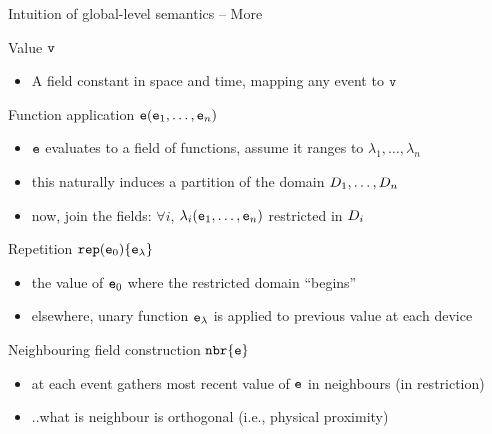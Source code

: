 \documentclass[presentation, 9pt]{beamer}\mode<presentation>{\usetheme{AMSBolognaFC}}
\begin{document}
\begin{frame}[fragile]{Intuition of global-level semantics -- More}
\begin{exampleblock}{Value $\texttt{v}$}
	\begin{itemize}
	\item A field constant in space and time, mapping any event to $\texttt{v}$
	\end{itemize}
	\end{exampleblock}
	\begin{exampleblock}{Function application ${\texttt{e}} (\texttt{e}_1,\ldots,\texttt{e}_n)$}
	\begin{itemize}
	\item $\texttt{e}$ evaluates to a field of functions, assume it ranges to $\lambda_1,\ldots,\lambda_n$
	\item this naturally induces a partition of the domain $D_1,\ldots,D_n$
	\item now, join the fields: $\forall i$, $\lambda_i (\texttt{e}_1,\ldots,\texttt{e}_n)$ restricted in $D_i$
	\end{itemize}
	\end{exampleblock}
	\begin{exampleblock}{Repetition $\texttt{rep}(\texttt{e}_0)\{\texttt{e}_\lambda\}$}
	\begin{itemize}
	\item the value of $\texttt{e}_0$ where the restricted domain ``begins''
	\item elsewhere, unary function $\texttt{e}_\lambda$ is applied to previous value at each device
	\end{itemize}
	\end{exampleblock}
	\begin{exampleblock}{Neighbouring  field construction $\texttt{nbr}\{\texttt{e}\}$}
	\begin{itemize}
	\item at each event gathers most recent value of $\texttt{e}$ in neighbours (in restriction)
	\item ..what is neighbour is orthogonal (i.e., physical proximity)
	\end{itemize}
	\end{exampleblock}
\end{frame}
\end{document}
